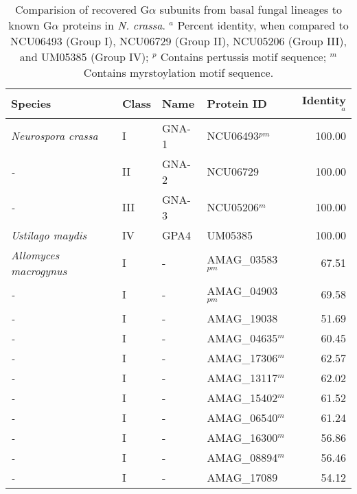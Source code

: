 
{\renewcommand{\arraystretch}{0.5} %
{\footnotesize %
\begin{longtable}{llllr}
\caption[G$\alpha$ subunit comparison]{Comparision of recovered G$\alpha$ subunits from basal fungal lineages to known G$\alpha$ proteins in \textit{N. crassa}. $^{a}$ Percent identity, when compared to NCU06493 (Group I), NCU06729 (Group II), NCU05206 (Group III), and UM05385 (Group IV); $^{p}$ Contains pertussis motif sequence; $^{m}$ Contains myrstoylation motif sequence.} \label{tab:ChRhodA_Gcomp} \\
  \hline
Species & Class & Name & Protein ID & Identity$^{a}$ \\ 
  \hline
\emph{Neurospora crassa } & I & GNA-1 & NCU06493$^{pm}$ & 100.00 \\ 
  \emph{-} & II & GNA-2 & NCU06729 & 100.00 \\ 
  \emph{-} & III & GNA-3 & NCU05206$^{m}$ & 100.00 \\ 
  \emph{Ustilago maydis} & IV & GPA4 & UM05385 & 100.00 \\ 
  \emph{Allomyces macrogynus} & I & - & AMAG\_03583$^{pm}$ & 67.51 \\ 
  \emph{-} & I & - & AMAG\_04903$^{pm}$ & 69.58 \\ 
  \emph{-} & I & - & AMAG\_19038 & 51.69 \\ 
  \emph{-} & I & - & AMAG\_04635$^{m}$ & 60.45 \\ 
  \emph{-} & I & - & AMAG\_17306$^{m}$ & 62.57 \\ 
  \emph{-} & I & - & AMAG\_13117$^{m}$ & 62.02 \\ 
  \emph{-} & I & - & AMAG\_15402$^{m}$ & 61.52 \\ 
  \emph{-} & I & - & AMAG\_06540$^{m}$ & 61.24 \\ 
  \emph{-} & I & - & AMAG\_16300$^{m}$ & 56.86 \\ 
  \emph{-} & I & - & AMAG\_08894$^{m}$ & 56.46 \\ 
  \emph{-} & I & - & AMAG\_17089 & 54.12 \\ 

\end{longtable}}}
